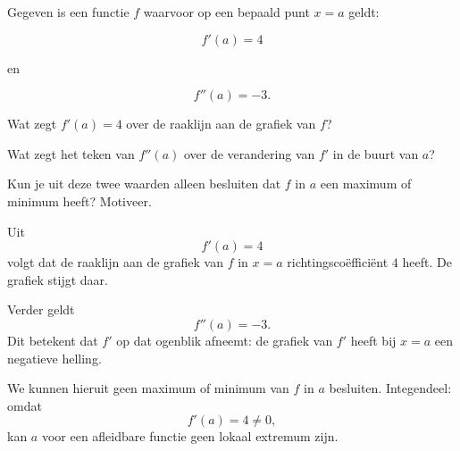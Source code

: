 \documentclass{ximera}
\begin{document}

\begin{oefening}{\oefU\ESS}

Gegeven is een functie $f$ waarvoor op een bepaald punt $x=a$ geldt:

\[
f'(a)=4
\]

en

\[
f''(a)=-3.
\]

\begin{question}
Wat zegt $f'(a)=4$ over de raaklijn aan de grafiek van $f$?
\end{question}

\begin{question}
Wat zegt het teken van $f''(a)$ over de verandering van $f'$ in de
buurt van $a$?
\end{question}

\begin{question}
Kun je uit deze twee waarden alleen besluiten dat $f$ in $a$ een
maximum of minimum heeft? Motiveer.
\end{question}

\begin{oplossing}

Uit
\[
f'(a)=4
\]
volgt dat de raaklijn aan de grafiek van $f$ in $x=a$
richtingscoëfficiënt $4$ heeft. De grafiek stijgt daar.

Verder geldt
\[
f''(a)=-3.
\]
Dit betekent dat $f'$ op dat ogenblik afneemt: de grafiek van $f'$ heeft
bij $x=a$ een negatieve helling.

We kunnen hieruit geen maximum of minimum van $f$ in $a$ besluiten.
Integendeel: omdat
\[
f'(a)=4\neq0,
\]
kan $a$ voor een afleidbare functie geen lokaal extremum zijn.

\end{oplossing}

\end{oefening}


\end{document}
